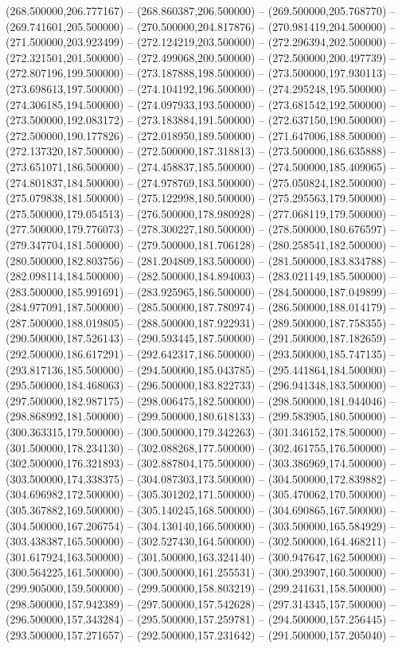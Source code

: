 (268.500000,206.777167) -- (268.860387,206.500000) -- (269.500000,205.768770) -- (269.741601,205.500000) -- (270.500000,204.817876) -- (270.981419,204.500000) -- (271.500000,203.923499) -- (272.124219,203.500000) -- (272.296394,202.500000) -- (272.321501,201.500000) -- (272.499068,200.500000) -- (272.500000,200.497739) -- (272.807196,199.500000) -- (273.187888,198.500000) -- (273.500000,197.930113) -- (273.698613,197.500000) -- (274.104192,196.500000) -- (274.295248,195.500000) -- (274.306185,194.500000) -- (274.097933,193.500000) -- (273.681542,192.500000) -- (273.500000,192.083172) -- (273.183884,191.500000) -- (272.637150,190.500000) -- (272.500000,190.177826) -- (272.018950,189.500000) -- (271.647006,188.500000) -- (272.137320,187.500000) -- (272.500000,187.318813) -- (273.500000,186.635888) -- (273.651071,186.500000) -- (274.458837,185.500000) -- (274.500000,185.409065) -- (274.801837,184.500000) -- (274.978769,183.500000) -- (275.050824,182.500000) -- (275.079838,181.500000) -- (275.122998,180.500000) -- (275.295563,179.500000) -- (275.500000,179.054513) -- (276.500000,178.980928) -- (277.068119,179.500000) -- (277.500000,179.776073) -- (278.300227,180.500000) -- (278.500000,180.676597) -- (279.347704,181.500000) -- (279.500000,181.706128) -- (280.258541,182.500000) -- (280.500000,182.803756) -- (281.204809,183.500000) -- (281.500000,183.834788) -- (282.098114,184.500000) -- (282.500000,184.894003) -- (283.021149,185.500000) -- (283.500000,185.991691) -- (283.925965,186.500000) -- (284.500000,187.049899) -- (284.977091,187.500000) -- (285.500000,187.780974) -- (286.500000,188.014179) -- (287.500000,188.019805) -- (288.500000,187.922931) -- (289.500000,187.758355) -- (290.500000,187.526143) -- (290.593445,187.500000) -- (291.500000,187.182659) -- (292.500000,186.617291) -- (292.642317,186.500000) -- (293.500000,185.747135) -- (293.817136,185.500000) -- (294.500000,185.043785) -- (295.441864,184.500000) -- (295.500000,184.468063) -- (296.500000,183.822733) -- (296.941348,183.500000) -- (297.500000,182.987175) -- (298.006475,182.500000) -- (298.500000,181.944046) -- (298.868992,181.500000) -- (299.500000,180.618133) -- (299.583905,180.500000) -- (300.363315,179.500000) -- (300.500000,179.342263) -- (301.346152,178.500000) -- (301.500000,178.234130) -- (302.088268,177.500000) -- (302.461755,176.500000) -- (302.500000,176.321893) -- (302.887804,175.500000) -- (303.386969,174.500000) -- (303.500000,174.338375) -- (304.087303,173.500000) -- (304.500000,172.839882) -- (304.696982,172.500000) -- (305.301202,171.500000) -- (305.470062,170.500000) -- (305.367882,169.500000) -- (305.140245,168.500000) -- (304.690865,167.500000) -- (304.500000,167.206754) -- (304.130140,166.500000) -- (303.500000,165.584929) -- (303.438387,165.500000) -- (302.527430,164.500000) -- (302.500000,164.468211) -- (301.617924,163.500000) -- (301.500000,163.324140) -- (300.947647,162.500000) -- (300.564225,161.500000) -- (300.500000,161.255531) -- (300.293907,160.500000) -- (299.905000,159.500000) -- (299.500000,158.803219) -- (299.241631,158.500000) -- (298.500000,157.942389) -- (297.500000,157.542628) -- (297.314345,157.500000) -- (296.500000,157.343284) -- (295.500000,157.259781) -- (294.500000,157.256445) -- (293.500000,157.271657) -- (292.500000,157.231642) -- (291.500000,157.205040) -- 